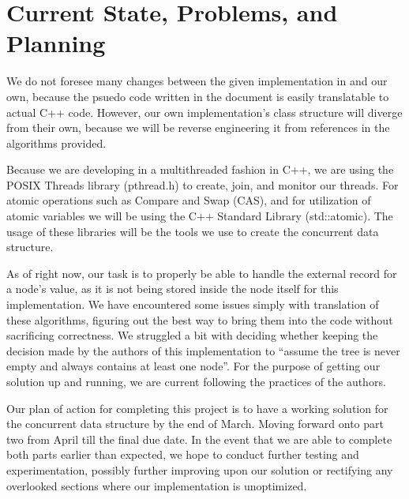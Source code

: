 \documentclass[12pt,a4paper]{article}
\begin{document}
\section{Current State, Problems, and Planning}
We do not foresee many changes between the given implementation in \cite{RedBlackDoc} and our own, because the psuedo code written in the document is easily translatable to actual C++ code. However, our own implementation's class structure will diverge from their own, because we will be reverse engineering it from references in the algorithms provided.
\par Because we are developing in a multithreaded fashion in C++, we are using the POSIX Threads library (pthread.h) to create, join, and monitor our threads. For atomic operations such as Compare and Swap (CAS), and for utilization of atomic variables we will be using the C++ Standard Library (std::atomic). The usage of these libraries will be the tools we use to create the concurrent data structure.
\par As of right now, our task is to properly be able to handle the external record for a node's value, as it is not being stored inside the node itself for this implementation. We have encountered some issues simply with translation of these algorithms, figuring out the best way to bring them into the code without sacrificing correctness. We struggled a bit with deciding whether keeping the decision made by the authors of this implementation to ``assume the tree is never empty and always contains at least one node''\cite{RedBlackDoc}. For the purpose of getting our solution up and running, we are current following the practices of the authors.
\par Our plan of action for completing this project is to have a working solution for the concurrent data structure by the end of March. Moving forward onto part two from April till the final due date. In the event that we are able to complete both parts earlier than expected, we hope to conduct further testing and experimentation, possibly further improving upon our solution or rectifying any overlooked sections where our implementation is unoptimized.
\newpage
{}


\end{document}
